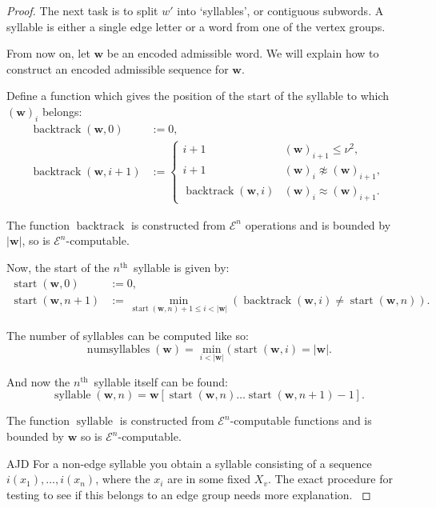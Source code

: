 \documentclass[a4paper]{article}
\newcommand{\grz}[1]{$\mathcal{E}^{#1}$}	%
\newcommand{\nth}{$n^{\textrm{th}}$~}	%
\newcommand{\wvec}{\mathbf{w}}	%
\newcommand{\recur}[1]{\begin{equation} \begin{split} #1 \end{split} \end{equation}}	%
\theoremstyle{plain}
\theoremstyle{definition}
\newenvironment{ad}{\noindent\color{blue} AJD }{}
\newcommand{\ajd}[1]{
\begin{ad} #1 \end{ad}}
\begin{document}
\begin{proof}
The next task is to split $w'$ into `syllables', or contiguous subwords. A syllable is either a single edge letter or a word from one of the vertex groups.

From now on, let $\wvec$ be an encoded admissible word.  We will explain how to construct an encoded admissible sequence for $\wvec$.

Define a function which gives the position of the start of the syllable to which $(\wvec)_i$ belongs:
\recur{
	\operatorname{backtrack}(\wvec,0) &:= 0, \\
	\operatorname{backtrack}(\wvec,i+1) &:= \begin{cases}
																					i+1	&	(\wvec)_{i+1} \leq \nu^2, \\
																					i+1	&	(\wvec)_i \not \approx (\wvec)_{i+1}, \\
																					\operatorname{backtrack}(\wvec,i)	&	(\wvec)_i \approx (\wvec)_{i+1}.
																				\end{cases}
}

The function $\operatorname{backtrack}$ is constructed from \grz{n} operations and is bounded by $|\wvec|$, so is \grz{n}-computable.

Now, the start of the \nth syllable is given by:
\recur{
\operatorname{start}(\wvec,0) &:= 0, \\
\operatorname{start}(\wvec,n+1) &:= \min_{\operatorname{start}(\wvec,n)+1 \leq i < |\wvec|} (\operatorname{backtrack}(\wvec,i) \neq \operatorname{start}(\wvec,n)).
}

The number of syllables can be computed like so:
\begin{equation} \operatorname{numsyllables}(\wvec) = \min_{i < |\wvec|} ( \operatorname{start}(\wvec,i) = |\wvec|. \end{equation}

And now the \nth syllable itself can be found:
\begin{equation} \operatorname{syllable}(\wvec,n) = \wvec[\operatorname{start}(\wvec,n) \dots \operatorname{start}(\wvec,n+1)-1]. \end{equation}

The function $\operatorname{syllable}$ is constructed from \grz{n}-computable functions and is bounded by $\wvec$ so is \grz{n}-computable.
\ajd{For a non-edge syllable you obtain a syllable consisting of a 
 sequence $i(x_1), \ldots ,i(x_n)$, 
where the $x_i$ are in some fixed $X_v$. The exact procedure for testing to see if 
this 
belongs to an edge group needs more explanation.}


\end{proof}
\end{document}
